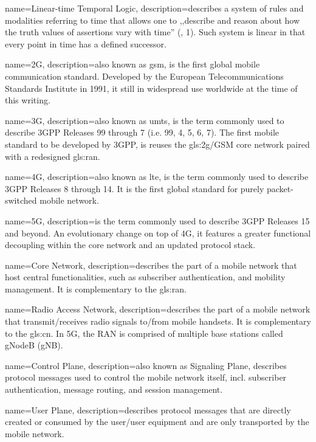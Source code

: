 {
    name={Linear-time Temporal Logic},
    description={describes a system of rules and modalities referring to time that allows one to ,,describe and reason about how the truth values of assertions vary
with time'' (\cite{emerson1990temporal}, 1). Such system is linear in that every point in time has a defined successor.}
}

{
    name={2G},
    description={also known as \gls{gsm}, is the first global mobile communication standard. Developed by the European Telecommunications Standards Institute in 1991, it still in widespread use worldwide at the time of this writing.}
}

{
    name={3G},
    description={also known as \gls{umts}, is the term commonly used to describe 3GPP Releases 99 through 7 (i.e. 99, 4, 5, 6, 7). The first mobile standard to be developed by 3GPP, is reuses the \gls{gls:2g}/GSM core network paired with a redesigned \gls{gls:ran}.}
}

{
    name={4G},
    description={also known as \gls{lte}, is the term commonly used to describe 3GPP Releases 8 through 14. It is the first global standard for purely packet-switched mobile network.}
}

{
    name={5G},
    description={is the term commonly used to describe 3GPP Releases 15 and beyond. An evolutionary change on top of 4G, it features a greater functional decoupling within the core network and an updated protocol stack.}
}

{
    name={Core Network},
    description={describes the part of a mobile network that host central functionalities, such as subscriber authentication, and mobility management. It is complementary to the \gls{gls:ran}.}
}

{
    name={Radio Access Network},
    description={describes the part of a mobile network that transmit/receives radio signals to/from mobile handsets. It is complementary to the \gls{gls:cn}. In 5G, the RAN is comprised of multiple base stations called gNodeB (gNB).}
}

{
    name={Control Plane},
    description={also known as Signaling Plane, describes protocol messages used to control the mobile network itself, incl. subscriber authentication, message routing, and session management.}
}

{
    name={User Plane},
    description={describes protocol messages that are directly created or consumed by the user/user equipment and are only transported by the mobile network.}
}